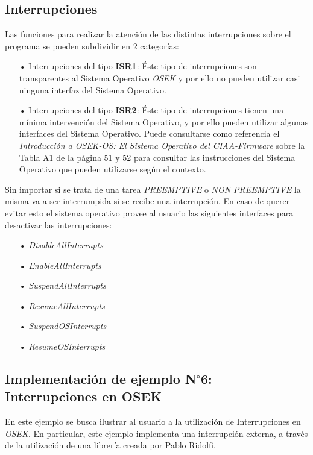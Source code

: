 \documentclass[12pt,letterpaper]{article}
\begin{document}
\subsection{Interrupciones}
Las funciones para realizar la atención de las distintas interrupciones sobre el programa se pueden subdividir en 2 categorías\cite{libroosekcerdeiro}:
\begin{enumerate}
\item[•]Interrupciones del tipo \textbf{ISR1}: Éste tipo de interrupciones son transparentes al Sistema Operativo \textit{OSEK} y por ello no pueden utilizar casi ninguna interfaz del Sistema Operativo.
\item[•]Interrupciones del tipo \textbf{ISR2}: Éste tipo de interrupciones tienen una mínima intervención del Sistema Operativo, y por ello pueden utilizar algunas interfaces del Sistema Operativo. Puede consultarse como referencia el \textit{Introducción a OSEK-OS: El Sistema Operativo del CIAA-Firmware} sobre la Tabla A1 de la página 51 y 52 para consultar las instrucciones del Sistema Operativo que pueden utilizarse según el contexto.
\end{enumerate}

Sin importar si se trata de una tarea \textit{PREEMPTIVE} o \textit{NON PREEMPTIVE} la misma va a ser interrumpida si se recibe una interrupción. En caso de querer evitar esto el sistema operativo provee al usuario las siguientes
interfaces para desactivar las interrupciones:
\begin{enumerate}
\item[•]\textit{DisableAllInterrupts}
\item[•]\textit{EnableAllInterrupts}
\item[•]\textit{SuspendAllInterrupts}
\item[•]\textit{ResumeAllInterrupts}
\item[•]\textit{SuspendOSInterrupts}
\item[•]\textit{ResumeOSInterrupts}
\end{enumerate}

\subsection{Implementación de ejemplo N$^{\circ}$6: Interrupciones en OSEK}
En este ejemplo se busca ilustrar al usuario a la utilización de Interrupciones en \textit{OSEK}. En particular, este ejemplo implementa una interrupción externa, a través de la utilización de una librería creada por Pablo Ridolfi\cite{enlacelibreriainterrupcion}.
\end{document}

